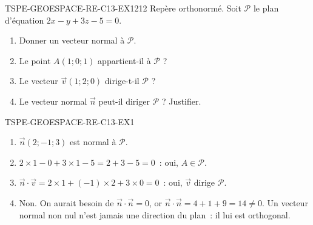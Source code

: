 
\begin{exercice}{TSPE-GEOESPACE-RE-C13-EX1}{2}{12}
Repère orthonormé. Soit $\mathcal{P}$ le plan d'équation $2x-y+3z-5=0$.
\begin{enumerate}
  \item Donner un vecteur normal à $\mathcal{P}$.
  \item Le point $A(1;0;1)$ appartient-il à $\mathcal{P}$ ?
  \item Le vecteur $\vec{v}(1;2;0)$ dirige-t-il $\mathcal{P}$ ?
  \item Le vecteur normal $\vec{n}$ peut-il diriger $\mathcal{P}$ ? Justifier.
\end{enumerate}
\end{exercice}


\begin{corrige}{TSPE-GEOESPACE-RE-C13-EX1}
\begin{enumerate}
  \item $\vec{n}(2;-1;3)$ est normal à $\mathcal{P}$.
  \item $2\times1-0+3\times1-5=2+3-5=0$~: oui, $A\in\mathcal{P}$.
  \item $\vec{n}\cdot\vec{v}=2\times1+(-1)\times2+3\times0=0$~: oui,
        $\vec{v}$ dirige $\mathcal{P}$.
  \item Non. On aurait besoin de $\vec{n}\cdot\vec{n}=0$, or
        $\vec{n}\cdot\vec{n}=4+1+9=14\neq0$. Un vecteur normal non nul n'est
        jamais une direction du plan~: il lui est orthogonal.
\end{enumerate}
\end{corrige}
